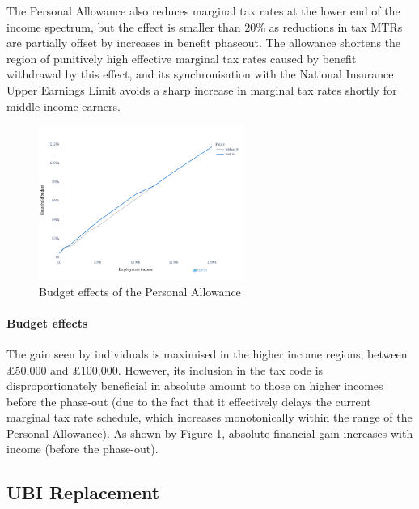 \documentclass{article}
\begin{document}
    The Personal Allowance also reduces marginal tax rates at the lower end of the income spectrum, but the effect is smaller than 20\% as reductions in tax MTRs are partially offset by increases in benefit phaseout. The allowance shortens the region of punitively high effective marginal tax rates caused by benefit withdrawal by this effect, and its synchronisation with the National Insurance Upper Earnings Limit avoids a sharp increase in marginal tax rates shortly for middle-income earners.

    \begin{figure}
        \centering
        \includegraphics[width=0.6\textwidth]{images/fig_3.png}
        \caption{Budget effects of the Personal Allowance}
        \label{fig:PA_budget_effects}
    \end{figure}

    \paragraph{Budget effects} The gain seen by individuals is maximised in the higher income regions, between £50,000 and £100,000. However, its inclusion in the tax code is disproportionately beneficial in absolute amount to those on higher incomes before the phase-out (due to the fact that it effectively delays the current marginal tax rate schedule, which increases monotonically within the range of the Personal Allowance). As shown by Figure \ref{fig:PA_budget_effects}, absolute financial gain increases with income (before the phase-out).

    \subsection{UBI Replacement}
\end{document}

